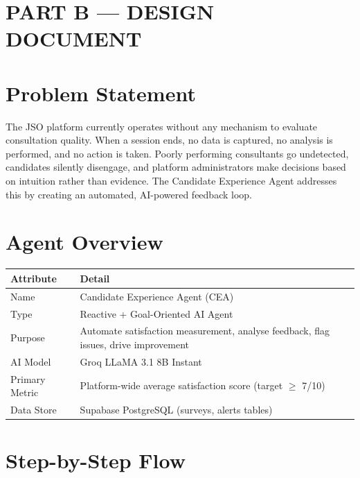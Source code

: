 \documentclass[11pt, a4paper]{article}
\begin{document}
\newpage

\section*{\LARGE PART B — DESIGN DOCUMENT}

\section{Problem Statement}

The JSO platform currently operates without any mechanism to evaluate consultation quality. When a session ends, no data is captured, no analysis is performed, and no action is taken. Poorly performing consultants go undetected, candidates silently disengage, and platform administrators make decisions based on intuition rather than evidence. The Candidate Experience Agent addresses this by creating an automated, AI-powered feedback loop.

\section{Agent Overview}

\begin{tabularx}{\textwidth}{l X}
\toprule
\textbf{Attribute} & \textbf{Detail} \\
\midrule
Name & Candidate Experience Agent (CEA) \\
Type & Reactive + Goal-Oriented AI Agent \\
Purpose & Automate satisfaction measurement, analyse feedback, flag issues, drive improvement \\
AI Model & Groq LLaMA 3.1 8B Instant \\
Primary Metric & Platform-wide average satisfaction score (target $\geq$ 7/10) \\
Data Store & Supabase PostgreSQL (surveys, alerts tables) \\
\bottomrule
\end{tabularx}

\section{Step-by-Step Flow}
\end{document}
